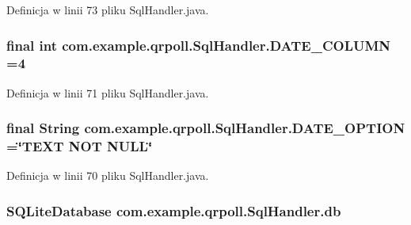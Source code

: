 Definicja w linii 73 pliku Sql\+Handler.\+java.

\hypertarget{classcom_1_1example_1_1qrpoll_1_1_sql_handler_ad3e3a44b82059d37635eda84d51228e6}{
\subsubsection[{D\+A\+T\+E\+\_\+\+C\+O\+L\+U\+M\+N}]{\setlength{\rightskip}{0pt plus 5cm}final int com.\+example.\+qrpoll.\+Sql\+Handler.\+D\+A\+T\+E\+\_\+\+C\+O\+L\+U\+M\+N =4\hspace{0.3cm}{\ttfamily [static]}}}\label{classcom_1_1example_1_1qrpoll_1_1_sql_handler_ad3e3a44b82059d37635eda84d51228e6}


Definicja w linii 71 pliku Sql\+Handler.\+java.

\hypertarget{classcom_1_1example_1_1qrpoll_1_1_sql_handler_a1d7af0faf52a8e5ba92eac4595bbb94c}{
\subsubsection[{D\+A\+T\+E\+\_\+\+O\+P\+T\+I\+O\+N}]{\setlength{\rightskip}{0pt plus 5cm}final String com.\+example.\+qrpoll.\+Sql\+Handler.\+D\+A\+T\+E\+\_\+\+O\+P\+T\+I\+O\+N =\char`\"{}T\+E\+X\+T N\+O\+T N\+U\+L\+L\char`\"{}\hspace{0.3cm}{\ttfamily [static]}}}\label{classcom_1_1example_1_1qrpoll_1_1_sql_handler_a1d7af0faf52a8e5ba92eac4595bbb94c}


Definicja w linii 70 pliku Sql\+Handler.\+java.

\hypertarget{classcom_1_1example_1_1qrpoll_1_1_sql_handler_a5b422e7952698eb1df158709d4e18007}{
\subsubsection[{db}]{\setlength{\rightskip}{0pt plus 5cm}S\+Q\+Lite\+Database com.\+example.\+qrpoll.\+Sql\+Handler.\+db\hspace{0.3cm}{\ttfamily [private]}}}\label{classcom_1_1example_1_1qrpoll_1_1_sql_handler_a5b422e7952698eb1df158709d4e18007}


